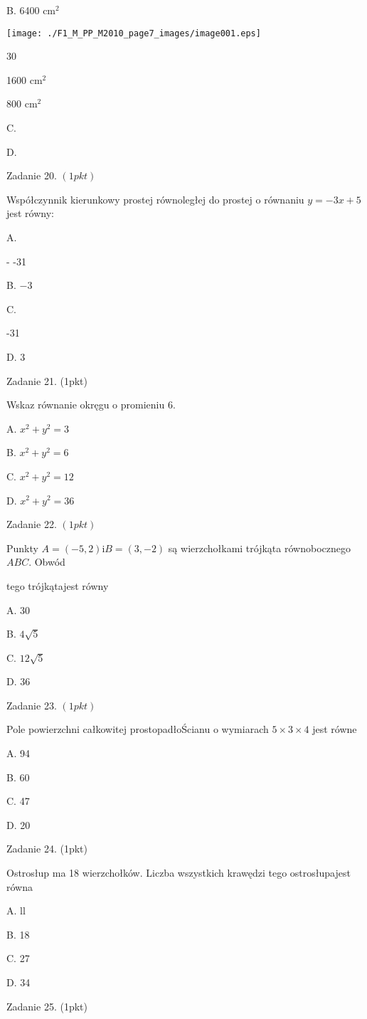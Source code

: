 \documentclass[a4paper,12pt]{article}
\begin{document}
B. 6400 $\mathrm{c}\mathrm{m}^{2}$
\begin{center}
\texttt{[image: ./F1\_M\_PP\_M2010\_page7\_images/image001.eps]}
\end{center}
30

1600 $\mathrm{c}\mathrm{m}^{2}$

800 $\mathrm{c}\mathrm{m}^{2}$

C.

D.

Zadanie 20. $(1pkt)$

Współczynnik kierunkowy prostej równoległej do prostej o równaniu $y=-3x+5$ jest równy:

A.

- -31

B. $-3$

C.

-31

D. 3

Zadanie 21. (1pkt)

Wskaz równanie okręgu o promieniu 6.

A. $x^{2}+y^{2}=3$

B. $x^{2}+y^{2}=6$

C. $x^{2}+y^{2}=12$

D. $x^{2}+y^{2}=36$

Zadanie 22. $(1pkt)$

Punkty $A=(-5,2) \mathrm{i} B=(3,-2)$ są wierzchołkami trójkąta równobocznego $ABC$. Obwód

tego trójkątajest równy

A. 30

B. $4\sqrt{5}$

C. $12\sqrt{5}$

D. 36

Zadanie 23. $(1pkt)$

Pole powierzchni całkowitej prostopadłoŚcianu o wymiarach $5\times 3\times 4$ jest równe

A. 94

B. 60

C. 47

D. 20

Zadanie 24. (1pkt)

Ostrosłup ma 18 wierzchołków. Liczba wszystkich krawędzi tego ostrosłupajest równa

A. ll

B. 18

C. 27

D. 34

Zadanie 25. (1pkt)
\end{document}
